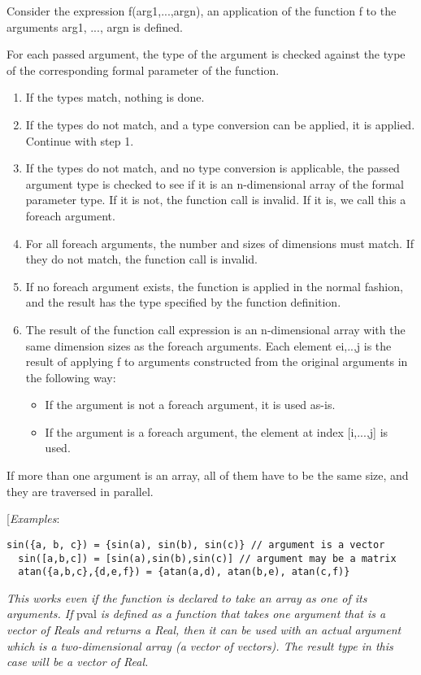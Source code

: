Consider the expression f(arg1,...,argn), an application of the function
f to the arguments arg1, ..., argn is defined.

For each passed argument, the type of the argument is checked against
the type of the corresponding formal parameter of the function.

\begin{enumerate}
\item
  If the types match, nothing is done.
\item
  If the types do not match, and a type conversion can be applied, it is
  applied. Continue with step 1.
\item
  If the types do not match, and no type conversion is applicable, the
  passed argument type is checked to see if it is an n-dimensional array
  of the formal parameter type. If it is not, the function call is
  invalid. If it is, we call this a foreach argument.
\item
  For all foreach arguments, the number and sizes of dimensions must
  match. If they do not match, the function call is invalid.
\item
  If no foreach argument exists, the function is applied in the normal
  fashion, and the result has the type specified by the function
  definition.
\item
  The result of the function call expression is an n-dimensional array
  with the same dimension sizes as the foreach arguments. Each element
  ei,..,j is the result of applying f to arguments constructed from the
  original arguments in the following way:
\begin{itemize}
\item
  If the argument is not a foreach argument, it is used as-is.
\item
  If the argument is a foreach argument, the element at index
  {[}i,...,j{]} is used.
\end{itemize}
\end{enumerate}

If more than one argument is an array, all of them have to be the same
size, and they are traversed in parallel.

{[}\emph{Examples}:

\begin{lstlisting}[language=modelica]
  sin({a, b, c}) = {sin(a), sin(b), sin(c)} // argument is a vector
  sin([a,b,c]) = [sin(a),sin(b),sin(c)] // argument may be a matrix
  atan({a,b,c},{d,e,f}) = {atan(a,d), atan(b,e), atan(c,f)}
\end{lstlisting}
\emph{This works even if the function is declared to take an array as
one of its arguments. If} pval \emph{is defined as a function that takes
one argument that is a vector of Reals and returns a Real, then it can
be used with an actual argument which is a two-dimensional array (a
vector of vectors). The result type in this case will be a vector of
Real. }

